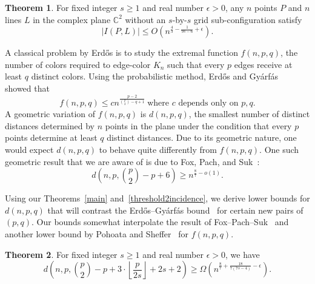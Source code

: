 \documentclass[11pt]{article}
\theoremstyle{definition}
\newtheorem{theorem}{Theorem}[section]
\begin{document}
\begin{theorem}\label{grid}
    For fixed integer $s \geq 1$ and real number $\epsilon > 0$, any $n$ points $P$ and $n$ lines $L$ in the complex plane $\mathbb{C}^2$ without an $s$-by-$s$ grid sub-configuration satisfy \begin{equation*}
        |I(P,L)| \leq O\left(n^{\frac{4}{3} - \frac{1}{9s-6} + \epsilon}\right).
    \end{equation*}
\end{theorem}

A classical problem by Erd\H{o}s is to study the extremal function $f(n,p,q)$, the number of colors required to edge-color $K_n$ such that every $p$ edges receive at least $q$ distinct colors. Using the probabilistic method, Erd\H{o}s and Gy\'arf\'as~\cite{erdHos1997variant} showed that \begin{equation*}
    f(n,p,q) \leq c n^{\frac{p-2}{\binom{p}{2}-q+1}} ~\text{where $c$ depends only on $p,q$.}
\end{equation*} A geometric variation of $f(n,p,q)$ is $d(n,p,q)$, the smallest number of distinct distances determined by $n$ points in the plane under the condition that every $p$ points determine at least $q$ distinct distances. Due to its geometric nature, one would expect $d(n,p,q)$ to behave quite differently from $f(n,p,q)$. One such geometric result that we are aware of is due to Fox, Pach, and Suk~\cite{fox2018more}:\begin{equation*}
    d\left( n,p,\binom{p}{2}-p+6 \right) \geq n^{\frac{8}{7} - o(1)}.
\end{equation*}

Using our Theorems~\ref{main} and~\ref{threshold2incidence}, we derive lower bounds for $d(n,p,q)$ that will contrast the Erd\H{o}s--Gy\'arf\'as bound~\cite{erdHos1997variant} for certain new pairs of $(p,q)$. Our bounds somewhat interpolate the result of Fox--Pach--Suk~\cite{fox2018more} and another lower bound by Pohoata and Sheffer~\cite{PS19} for $f(n,p,q)$.
\begin{theorem}\label{distance}
    For fixed integer $s\geq 1$ and real number $\epsilon > 0$, we have\begin{equation*}
        d\left(n, p, \binom{p}{2} - p + 3 \cdot \left\lfloor \frac{p}{2s} \right\rfloor + 2s + 2 \right) \geq \Omega\left( n^{\frac{8}{7} + \frac{18}{7(7s-4)} -\epsilon} \right).
    \end{equation*}
\end{theorem}

\medskip
\end{document}
